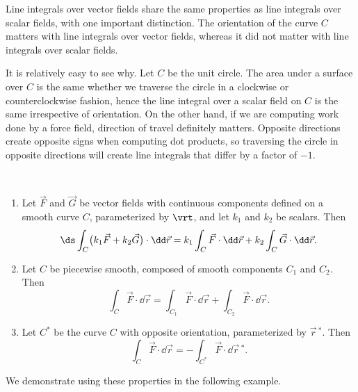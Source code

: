 Line integrals over vector fields share the same properties as line integrals over scalar fields, with one important distinction. The orientation of the curve $C$ matters with line integrals over vector fields, whereas it did not matter with line integrals over scalar fields.

It is relatively easy to see why. Let $C$ be the unit circle. The area under a surface over $C$ is the same whether we traverse the circle in a clockwise or counterclockwise fashion, hence the line integral over a scalar field on $C$ is the same irrespective of orientation. On the other hand, if we are computing work done by a force field, direction of travel definitely matters. Opposite directions create opposite signs when computing dot products, so traversing the circle in opposite directions will create line integrals that differ by a factor of $-1$. 

\begin{theorem}\label{thm:line_int_properties_vector}%
\mbox{}\\[-2\baselineskip]\parbox[t]{\linewidth}{%
\begin{enumerate}
	\item	Let $\vec F$ and $\vec G$ be  vector fields with continuous components defined on a smooth curve $C$, parameterized by $\vrt$, and let $k_1$ and $k_2$ be scalars. Then
	\[
	\ds \int_C\bigl(k_1\vec F+k_2\vec G\bigr)\cdot\dd\vec r
	= k_1\int_C\vec F\cdot\dd\vec r +k_2\int_C\vec G\cdot\dd\vec r.
	\]
	\item Let $C$ be piecewise smooth, composed of smooth components $C_1$ and $C_2$. Then
	\[
	\int_C\vec F\cdot\dd\vec r
	= \int_{C_1}\vec F\cdot\dd\vec r + \int_{C_2}\vec F\cdot\dd\vec r.
	\]
	\item	Let $C^*$ be the curve $C$ with opposite orientation, parameterized by $\vec r\,^*$. Then
	\[\int_C\vec F\cdot\dd\vec r = -\int_{C^*}\vec F\cdot\dd\vec r\,^*.\]
	\end{enumerate}}
\end{theorem}

We demonstrate using these properties in the following example.

